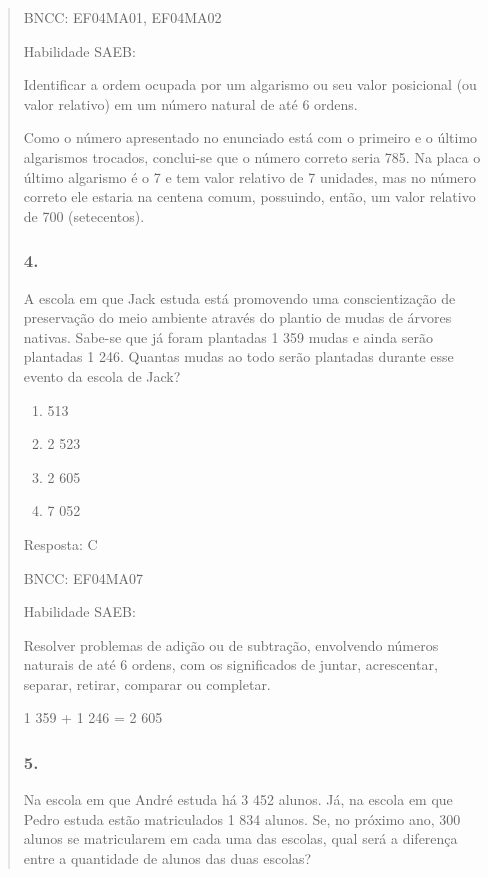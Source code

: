 \begin{enumerate}
\begin{escolha}
\begin{enumerate}
\begin{itemize}
\begin{itemize}
\begin{escolha}
\begin{quote}
\begin{escolha}
{BNCC: EF04MA01, EF04MA02

Habilidade SAEB:

Identificar a ordem ocupada por um algarismo ou seu valor posicional (ou
valor relativo) em um número natural de até 6 ordens.

Como o número apresentado no enunciado está com o primeiro e o último
algarismos trocados, conclui-se que o número correto seria 785. Na placa
o último algarismo é o 7 e tem valor relativo de 7 unidades, mas no
número correto ele estaria na centena comum, possuindo, então, um valor
relativo de 700 (setecentos).

\subsubsection{4.}\label{section-146}

A escola em que Jack estuda está promovendo uma conscientização de
preservação do meio ambiente através do plantio de mudas de árvores
nativas. Sabe-se que já foram plantadas 1 359 mudas e ainda serão
plantadas 1 246. Quantas mudas ao todo serão plantadas durante esse
evento da escola de Jack?

\begin{enumerate}
\def\labelenumi{\alph{enumi})}
\item
  513
\item
  2 523
\item
  2 605
\item
  7 052
\end{enumerate}

Resposta: C

BNCC: EF04MA07

Habilidade SAEB:

Resolver problemas de adição ou de subtração, envolvendo números
naturais de até 6 ordens, com os significados de juntar, acrescentar,
separar, retirar, comparar ou completar.

1 359 + 1 246 = 2 605

\subsubsection{5.}\label{section-147}

Na escola em que André estuda há 3 452 alunos. Já, na escola em que
Pedro estuda estão matriculados 1 834 alunos. Se, no próximo ano, 300
alunos se matricularem em cada uma das escolas, qual será a diferença
entre a quantidade de alunos das duas escolas?

}
\end{escolha}
\end{quote}
\end{escolha}
\end{itemize}
\end{itemize}
\end{enumerate}
\end{escolha}
\end{enumerate}
